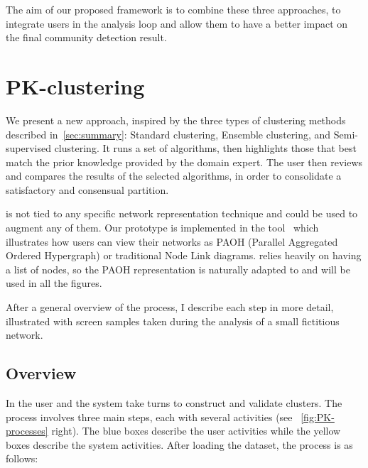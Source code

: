 The aim of our proposed framework is to combine these three approaches, to integrate users in the analysis loop and allow them to have a better impact on the final community detection result.


\section{PK-clustering}

We present a new approach, inspired by the three types of clustering methods described in~\autoref{sec:summary}: Standard clustering, Ensemble clustering, and Semi-supervised clustering. It runs a set of algorithms, then highlights those that best match the prior knowledge provided by the domain expert. %
The user then reviews and compares the results of the selected algorithms, in order to consolidate a satisfactory and consensual partition.

\pkclustering is not tied to any specific network representation technique and could be used to augment any of them. Our prototype is implemented in the \paovis tool~\cite{valdiviaAnalyzingDynamicHypergraphs2021} which illustrates how users can view their networks as PAOH (Parallel Aggregated Ordered Hypergraph) or traditional Node Link diagrams. \pkclustering relies heavily on having a list of nodes, so the PAOH representation is naturally adapted to \pkclustering and will be used in all the figures.

After a general overview of the process, I describe each step in more detail, illustrated with screen samples taken during the analysis of a small fictitious network.

\subsection{Overview}
\label{sec:pk-clustering}

In \pkclustering the user and the system take turns to construct and validate clusters.
The process involves three main steps, each with several activities (see ~\autoref{fig:PK-processes} right).
The blue boxes describe the user activities while the yellow boxes describe the system activities.
After loading the dataset, the process is as follows:

